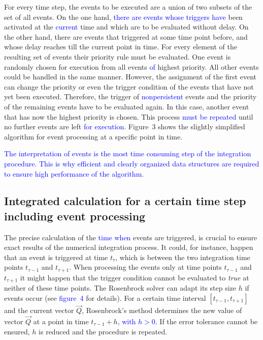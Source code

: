 \documentclass[10pt]{bmc_article}
\newenvironment{bmcformat}{\fussy\setboolean{publ}{true}}{\fussy}
\newcommand{\COR}[1]                      {\textcolor{blue}{#1}}
\newcommand{\true}                        {\emph{true}\xspace}
\begin{document}
\begin{bmcformat}
For every time step, the events to be executed are a union of two subsets of the set of all events.
On the one hand, \COR{there are events whose triggers have} been activated at the \COR{current} time and which are to be evaluated without delay.
On the other hand, there are events that triggered at some time point before, and whose delay reaches till the current point in time.
For every element of the resulting set of events their priority rule must be evaluated.
One event is randomly chosen for execution from all events \COR{of} highest priority.
All other events could be handled in the same manner.
However, the assignment of the first event can change the priority or even the trigger condition of the events that have not yet been executed.
Therefore, the trigger of \COR{nonpersistent} events and the priority of the remaining events have to be evaluated again.
In this case, another event that has now the highest priority is chosen.
This process \COR{must be repeated} until no further events are left \COR{for execution}.
Figure~3 shows the slightly simplified algorithm for event processing at a specific point in time.

\COR{The interpretation of events is the most time consuming step of the integration procedure.
This is why efficient and clearly organized data structures are required to ensure high performance of the algorithm}.

\subsection*{Integrated calculation for a certain time step including event processing}
The precise calculation of the \COR{time when} events are triggered\COR{,} is crucial to 
ensure exact results of the numerical integration process.
It could, for instance, happen that an event is triggered at time $t_{\tau}$,
which is between the two integration time points $t_{\tau - 1}$ and $t_{\tau + 1}$.
When processing the events only at time points $t_{\tau - 1}$ and $t_{\tau + 1}$
it might happen that the trigger condition cannot be evaluated to \true at
neither of these time points. 
The Rosenbrock solver \cite{Press1993} can adapt its step size $h$ if events
occur (see \COR{figure~4} for details).
For a certain time interval $[t_{\tau - 1}, t_{\tau + 1}]$ and the current vector
$\vec{Q}$\COR{,} Rosenbrock's method determines the new value of vector $\vec{Q}$ at a
point in time $t_{\tau - 1} + h$\COR{, with $h > 0$}.
If the error tolerance cannot be ensured, $h$ is reduced and the procedure is
repeated.


\end{bmcformat}
\end{document}
